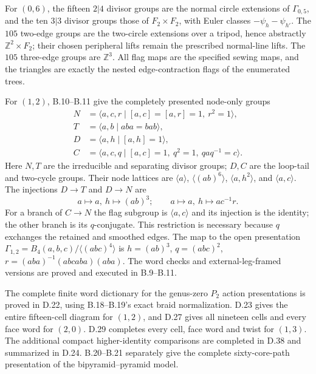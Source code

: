 For $(0,6)$, the fifteen $2|4$ divisor groups are the normal circle extensions of $\Gamma_{0,5}$, and the ten $3|3$ divisor groups those of $F_2\times F_2$, with Euler classes $-\psi_h-\psi_{h'}$. The $105$ two-edge groups are the two-circle extensions over a tripod, hence abstractly $\mathbb Z^2\times F_2$; their chosen peripheral lifts remain the prescribed normal-line lifts. The $105$ three-edge groups are $\mathbb Z^3$. All flag maps are the specified sewing maps, and the triangles are exactly the nested edge-contraction flags of the enumerated trees.

For $(1,2)$, B.10--B.11 give the completely presented node-only groups
\[
\begin{aligned}
 N&=\langle a,c,r\mid [a,c]=[a,r]=1,\ r^2=1\rangle,\\
 T&=\langle a,b\mid aba=bab\rangle,\\
 D&=\langle a,h\mid[a,h]=1\rangle,\\
 C&=\langle a,c,q\mid[a,c]=1,\ q^2=1,\ qaq^{-1}=c\rangle.
\end{aligned}
\]
Here $N,T$ are the irreducible and separating divisor groups; $D,C$ are the loop-tail and two-cycle groups. Their node lattices are $\langle a\rangle$, $\langle(ab)^6\rangle$, $\langle a,h^2\rangle$, and $\langle a,c\rangle$. The injections $D\to T$ and $D\to N$ are
\[
 a\mapsto a,\ h\mapsto(ab)^3;\qquad
 a\mapsto a,\ h\mapsto ac^{-1}r.
\]
For a branch of $C\to N$ the flag subgroup is $\langle a,c\rangle$ and its injection is the identity; the other branch is its $q$-conjugate. This restriction is necessary because $q$ exchanges the retained and smoothed edges. The map to the open presentation
$\Gamma_{1,2}=B_4(a,b,c)/\langle(abc)^4\rangle$
is
$h=(ab)^3$, $q=(abc)^2$, $r=(aba)^{-1}(abcaba)(aba)$.
The word checks and external-leg-framed versions are proved and executed in B.9--B.11.

The complete finite word dictionary for the genus-zero $P_2$ action presentations is proved in D.22, using B.18--B.19's exact braid normalization.  D.23 gives the entire fifteen-cell diagram for $(1,2)$, and D.27 gives all nineteen cells and every face word for $(2,0)$.  D.29 completes every cell, face word and twist for $(1,3)$.  The additional compact higher-identity comparisons are completed in D.38 and summarized in D.24.  B.20--B.21 separately give the complete sixty-core-path presentation of the bipyramid--pyramid model.
